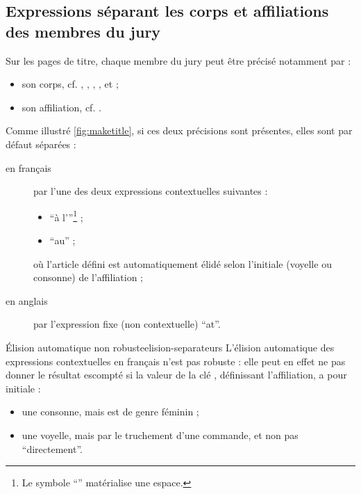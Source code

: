 \subsection{Expressions séparant les corps et affiliations des membres du jury}
\label{sec:expr-separ-les}

Sur les pages de titre, chaque membre du jury peut être précisé notamment par :
\begin{itemize}
\item son corps, cf. , , ,
  ,  et
   ;
\item son affiliation, cf. .
\end{itemize}
Comme illustré \vref{fig:maketitle}, si ces deux précisions sont présentes,
elles sont par défaut séparées :
\begin{description}
\item[en français] par l'une des deux expressions contextuelles suivantes :
  \begin{itemize}
  \item \enquote{\textvisiblespace{}à l'}\footnote{Le symbole
      \enquote{\textvisiblespace{}} matérialise une espace.} ;
  \item \enquote{\textvisiblespace{}au\textvisiblespace{}} ;
  \end{itemize}
  où l'article défini est automatiquement élidé selon l'initiale (voyelle ou
  consonne) de l'affiliation ;
\item[en anglais] par l'expression fixe (non contextuelle)
  \enquote{\textvisiblespace{}at\textvisiblespace{}}.
\end{description}

\begin{dbwarning}{Élision automatique non robuste}{elision-separateurs}
  L'élision automatique des expressions contextuelles en français n'est pas
  robuste : elle peut en effet ne pas donner le résultat escompté si la valeur
  de la clé , définissant l'affiliation, a pour initiale :
  \begin{itemize}
  \item une consonne, mais est de genre féminin ;
  \item une voyelle, mais par le truchement d'une commande\commandeacronyme, et
    non pas \enquote{directement}.
  \end{itemize}
\end{dbwarning}

